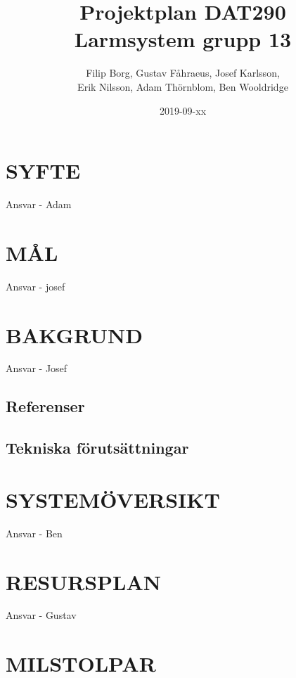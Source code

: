 \documentclass[a4paper]{article}
\title{Projektplan DAT290 \\ \Large Larmsystem grupp 13}
\author{Filip Borg, Gustav Fåhraeus, Josef Karlsson,\\
            Erik Nilsson, Adam Thörnblom, Ben Wooldridge}
\date{2019-09-xx}
\begin{document}
\maketitle
{}
\newpage

\tableofcontents
\newpage



\section{SYFTE}
\label{sec:syfte}

Ansvar - Adam

\section{MÅL}
\label{sec:mål}

Ansvar - josef

\section{BAKGRUND}
\label{sec:bakgrund}

Ansvar - Josef

\subsection{Referenser}
\label{sec:referenser}



\subsection{Tekniska förutsättningar}
\label{sec:tekniskaf}



\section{SYSTEMÖVERSIKT}
\label{sec:systemö}

Ansvar - Ben

\section{RESURSPLAN}
\label{sec:resurs}

Ansvar - Gustav

\section{MILSTOLPAR}
\label{sec:milstolpar}
\end{document}
